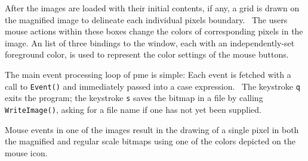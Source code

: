 
After the images are loaded with their initial contents, if any, a grid
is drawn on the magnified image to delineate each individual
pixel{\textquotesingle}s boundary. \ The user{\textquotesingle}s mouse
actions within these boxes change the colors of corresponding pixels in
the image. An list of three bindings to the window, each with an
independently-set foreground color, is used to represent the color
settings of the mouse buttons.


The main event processing loop of pme is simple: Each event is fetched
with a call to \texttt{Event()} and immediately passed into a case
expression. \ The keystroke \texttt{{\textquotedbl}q{\textquotedbl}}
exits the program; the keystroke
\texttt{{\textquotedbl}s{\textquotedbl}} saves the bitmap in a file by
calling \texttt{WriteImage()}, asking for a file name if one has not
yet been supplied.


Mouse events in one of the images result in the drawing of a single
pixel in both the magnified and regular scale bitmaps using one of the
colors depicted on the mouse icon. 

